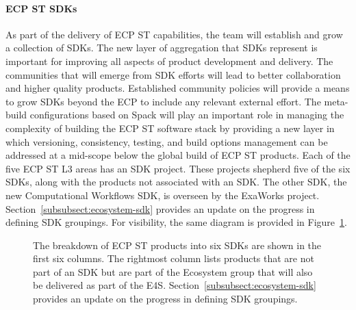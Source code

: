 \paragraph{ECP ST SDKs}
As part of the delivery of ECP ST capabilities, the team will establish and grow a collection of SDKs. The new layer of aggregation that SDKs represent is important for improving all aspects of product development and delivery. The communities that will emerge from SDK efforts will lead to better collaboration and higher quality products. Established community policies will provide a means to grow SDKs beyond the ECP to include any relevant external effort. The meta-build configurations based on Spack will play an important role in managing the complexity of building the ECP ST software stack by providing a new layer in which versioning, consistency, testing, and build options management can be addressed at a mid-scope below the global build of ECP ST products.
Each of the five ECP ST L3 areas has an SDK project. These projects shepherd five of the six SDKs, along with the products not associated with an SDK. The other SDK, the new Computational Workflows SDK, is overseen by the ExaWorks project. Section~\ref{subsubsect:ecosystem-sdk} provides an update on the progress in defining SDK groupings. For visibility, the same diagram is provided in Figure~\ref{fig:sdk-definition1-0}.

\begin{figure}[htb]
	\centering
	\caption{\label{fig:sdk-definition1-0}The breakdown of ECP ST products into six SDKs are shown in the first six columns. The rightmost column lists products that are not part of an SDK but are part of the Ecosystem group that will also be delivered as part of the E4S. Section~\ref{subsubsect:ecosystem-sdk} provides an update on the progress in defining SDK groupings.}
\end{figure}


